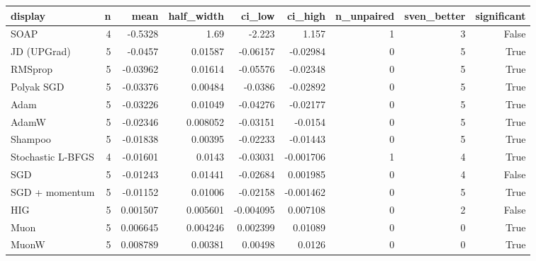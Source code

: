\begin{tabular}{lrrrrrrrr}
\toprule
display & n & mean & half\_width & ci\_low & ci\_high & n\_unpaired & sven\_better & significant \\
\midrule
SOAP & 4 & -0.5328 & 1.69 & -2.223 & 1.157 & 1 & 3 & False \\
JD (UPGrad) & 5 & -0.0457 & 0.01587 & -0.06157 & -0.02984 & 0 & 5 & True \\
RMSprop & 5 & -0.03962 & 0.01614 & -0.05576 & -0.02348 & 0 & 5 & True \\
Polyak SGD & 5 & -0.03376 & 0.00484 & -0.0386 & -0.02892 & 0 & 5 & True \\
Adam & 5 & -0.03226 & 0.01049 & -0.04276 & -0.02177 & 0 & 5 & True \\
AdamW & 5 & -0.02346 & 0.008052 & -0.03151 & -0.0154 & 0 & 5 & True \\
Shampoo & 5 & -0.01838 & 0.00395 & -0.02233 & -0.01443 & 0 & 5 & True \\
Stochastic L-BFGS & 4 & -0.01601 & 0.0143 & -0.03031 & -0.001706 & 1 & 4 & True \\
SGD & 5 & -0.01243 & 0.01441 & -0.02684 & 0.001985 & 0 & 4 & False \\
SGD + momentum & 5 & -0.01152 & 0.01006 & -0.02158 & -0.001462 & 0 & 5 & True \\
HIG & 5 & 0.001507 & 0.005601 & -0.004095 & 0.007108 & 0 & 2 & False \\
Muon & 5 & 0.006645 & 0.004246 & 0.002399 & 0.01089 & 0 & 0 & True \\
MuonW & 5 & 0.008789 & 0.00381 & 0.00498 & 0.0126 & 0 & 0 & True \\
\bottomrule
\end{tabular}
